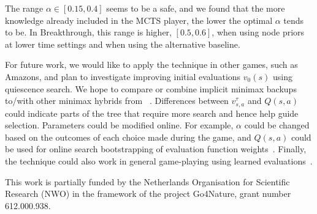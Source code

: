 \documentclass[conference]{IEEEtran}
\begin{document}
The range $\alpha \in [0.15,0.4]$ seems to be a safe, and we found 
that the more knowledge already included in the MCTS player, the lower
the optimal $\alpha$ tends to be. In Breakthrough, this range is higher, $[0.5,0.6]$, 
when using node priors at lower time settings and when using the alternative baseline. 

For future work, we would like to apply the technique in other games, such as Amazons, 
and plan to investigate improving initial evaluations $v_0(s)$ using quiescence search.
We hope to compare or combine implicit minimax backups to/with other 
minimax hybrids from ~\cite{Baier13MinimaxHybrids}. 
Differences between $v^{\tau}_{s,a}$ and $Q(s,a)$ could indicate parts of the tree that require 
more search and hence help guide selection. 
Parameters could be modified online. For example, $\alpha$ could be changed based on the outcomes
of each choice made during the game, and $Q(s,a)$ could be used for online search 
bootstrapping of evaluation function weights~\cite{Veness09Bootstrapping}.
Finally, the technique could also work in general game-playing using learned
evaluations~\cite{Finnsson10Learning}.

{\small
{} This work is partially funded by the Netherlands 
Organisation for Scientific Research (NWO) in the framework of the project Go4Nature, grant number 612.000.938. 
}

%
% 


%

%


\end{document}
